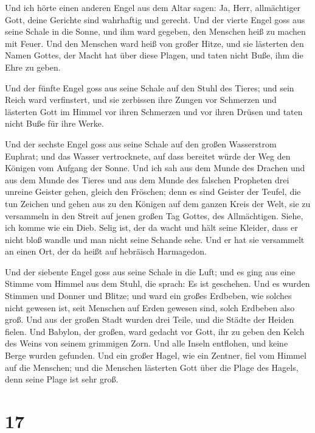  Und ich hörte einen anderen Engel aus dem Altar sagen:
Ja, Herr, allmächtiger Gott, deine Gerichte sind wahrhaftig und gerecht.
 Und der vierte Engel goss aus seine Schale in die Sonne,
und ihm ward gegeben, den Menschen heiß zu machen mit Feuer.
 Und den Menschen ward heiß von großer Hitze, und sie
lästerten den Namen Gottes, der Macht hat über diese Plagen, und taten
nicht Buße, ihm die Ehre zu geben.

 Und der fünfte Engel goss aus seine Schale auf den Stuhl
des Tieres; und sein Reich ward verfinstert, und sie zerbissen ihre
Zungen vor Schmerzen  und lästerten Gott im Himmel vor
ihren Schmerzen und vor ihren Drüsen und taten nicht Buße für ihre
Werke.

 Und der sechste Engel goss aus seine Schale auf den
großen Wasserstrom Euphrat; und das Wasser vertrocknete, auf dass
bereitet würde der Weg den Königen vom Aufgang der Sonne.
 Und ich sah aus dem Munde des Drachen und aus dem Munde
des Tieres und aus dem Munde des falschen Propheten drei unreine Geister
gehen, gleich den Fröschen;  denn es sind Geister der
Teufel, die tun Zeichen und gehen aus zu den Königen auf dem ganzen
Kreis der Welt, sie zu versammeln in den Streit auf jenen großen Tag
Gottes, des Allmächtigen.  Siehe, ich komme wie ein Dieb.
Selig ist, der da wacht und hält seine Kleider, dass er nicht bloß
wandle und man nicht seine Schande sehe.  Und er hat sie
versammelt an einen Ort, der da heißt auf hebräisch Harmagedon.

 Und der siebente Engel goss aus seine Schale in die
Luft; und es ging aus eine Stimme vom Himmel aus dem Stuhl, die sprach:
Es ist geschehen.  Und es wurden Stimmen und Donner und
Blitze; und ward ein großes Erdbeben, wie solches nicht gewesen ist,
seit Menschen auf Erden gewesen sind, solch Erdbeben also groß.
 Und aus der großen Stadt wurden drei Teile, und die
Städte der Heiden fielen. Und Babylon, der großen, ward gedacht vor
Gott, ihr zu geben den Kelch des Weins von seinem grimmigen Zorn.
 Und alle Inseln entflohen, und keine Berge wurden
gefunden.  Und ein großer Hagel, wie ein Zentner, fiel
vom Himmel auf die Menschen; und die Menschen lästerten Gott über die
Plage des Hagels, denn seine Plage ist sehr groß.

\hypertarget{section-16}{%
\section{17}\label{section-16}}

